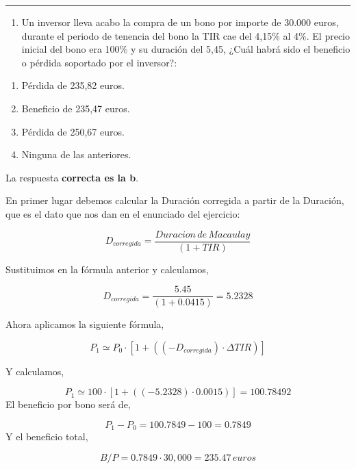 \documentclass[
  letterpaper,
  DIV=11,
  numbers=noendperiod]{scrreprt}
\providecommand{\tightlist}{%
  \setlength{\itemsep}{0pt}\setlength{\parskip}{0pt}}\usepackage{longtable,booktabs,array}
\begin{document}
\begin{center}\rule{0.5\linewidth}{0.5pt}\end{center}

\begin{enumerate}
\def\labelenumi{\arabic{enumi}.}
\setcounter{enumi}{61}
\tightlist
\item
  Un inversor lleva acabo la compra de un bono por importe de 30.000
  euros, durante el periodo de tenencia del bono la TIR cae del 4,15\%
  al 4\%. El precio inicial del bono era 100\% y su duración del 5,45,
  ¿Cuál habrá sido el beneficio o pérdida soportado por el inversor?:
\end{enumerate}

\begin{enumerate}
\def\labelenumi{\alph{enumi})}
\item
  Pérdida de 235,82 euros.
\item
  Beneficio de 235,47 euros.
\item
  Pérdida de 250,67 euros.
\item
  Ninguna de las anteriores.
\end{enumerate}

\begin{tcolorbox}[enhanced jigsaw, left=2mm, opacityback=0, colback=white, breakable, arc=.35mm, bottomrule=.15mm, rightrule=.15mm, toprule=.15mm, leftrule=.75mm, colframe=quarto-callout-tip-color-frame]
\begin{minipage}[t]{5.5mm}
\textcolor{quarto-callout-tip-color}{\faLightbulb}
\end{minipage}%
\begin{minipage}[t]{\textwidth - 5.5mm}

La respuesta \textbf{correcta es la b}.

En primer lugar debemos calcular la Duración corregida a partir de la
Duración, que es el dato que nos dan en el enunciado del ejercicio:

\[D_{corregida}=\frac{Duracion\,de\, Macaulay}{\left(1+TIR\right)}\]

Sustituimos en la fórmula anterior y calculamos,

\[D_{corregida}=\frac{5.45}{(1+0.0415)}=5.2328\]

Ahora aplicamos la siguiente fórmula,

\[P_1\simeq P_0\cdot\left[1+(\left(-D_{corregida}\right)\cdot\Delta TIR)\right]\]

Y calculamos,

\[P_1\simeq 100\cdot\left[1+(\left(-5.2328\right)\cdot0.0015)\right]=100.78492\]
El beneficio por bono será de,

\[P_1-P_0=100.7849-100=0.7849\] Y el beneficio total,

\[B/P = 0.7849\cdot 30,000=235.47\,euros\]

\end{minipage}%
\end{tcolorbox}
\end{document}
